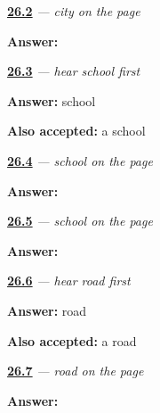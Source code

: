 \noindent\begin{minipage}[t]{\linewidth}
\raggedright
\hyperlink{review-GU-C22-shahar-copy}{\textbf{26.2}} \emph{ — city on the page}\par
\small \textbf{Answer:} \par
\end{minipage}\par\medskip

\noindent\begin{minipage}[t]{\linewidth}
\raggedright
\hyperlink{review-GU-C22-hear-shaalaa-recall}{\textbf{26.3}} \emph{ — hear school first}\par
\small \textbf{Answer:} school\par
\footnotesize \textbf{Also accepted:} a school
\end{minipage}\par\medskip

\noindent\begin{minipage}[t]{\linewidth}
\raggedright
\hyperlink{review-GU-C22-shaalaa-city-r1}{\textbf{26.4}} \emph{ — school on the page}\par
\small \textbf{Answer:} \par
\end{minipage}\par\medskip

\noindent\begin{minipage}[t]{\linewidth}
\raggedright
\hyperlink{review-GU-C22-shaalaa-delayed}{\textbf{26.5}} \emph{ — school on the page}\par
\small \textbf{Answer:} \par
\end{minipage}\par\medskip

\noindent\begin{minipage}[t]{\linewidth}
\raggedright
\hyperlink{review-GU-C22-hear-rasto-recall}{\textbf{26.6}} \emph{ — hear road first}\par
\small \textbf{Answer:} road\par
\footnotesize \textbf{Also accepted:} a road
\end{minipage}\par\medskip

\noindent\begin{minipage}[t]{\linewidth}
\raggedright
\hyperlink{review-GU-C22-rasto-copy}{\textbf{26.7}} \emph{ — road on the page}\par
\small \textbf{Answer:} \par
\end{minipage}\par\medskip

